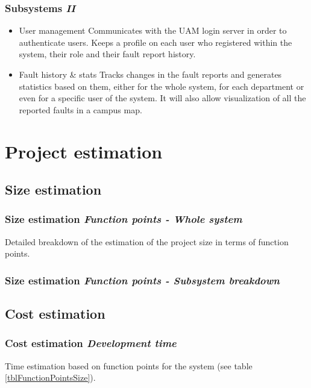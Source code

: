 \documentclass[10pt, compress,usetitleprogressbar,aspectratio=1610]{beamer}
\begin{document}
\begin{frame}
\frametitle{Subsystems \hfill \emph{II}}
\begin{itemize}
\item \alert{User management} Communicates with the UAM login server in order to authenticate users. Keeps a profile on each user who registered within the system, their role and their fault report history.
\item \alert{Fault history \& stats} Tracks changes in the fault reports and generates statistics based on them, either for the whole system, for each department or even for a specific user of the system. It will also allow visualization of all the reported faults in a campus map.
\end{itemize}
\end{frame}

\section{Project estimation}

\subsection{Size estimation}
\begin{frame}
\frametitle{Size estimation \hfill \emph{Function points - Whole system}}
\begin{table}[hbtp]
\centering

\caption{Detailed breakdown of the estimation of the project size in terms of function points.}
\label{tblFunctionPointsSize}
\end{table}
\end{frame}

\begin{frame}
\frametitle{Size estimation \hfill \emph{Function points - Subsystem breakdown}}
\end{frame}

\subsection{Cost estimation}
\begin{frame}
\frametitle{Cost estimation \hfill \emph{Development time}}
\begin{table}[hbtp]
\centering

\caption{Time estimation based on function points for the system (see table \ref{tblFunctionPointsSize}).}
\label{tblFunctionPointsTime}
\end{table}
\end{frame}
\end{document}
